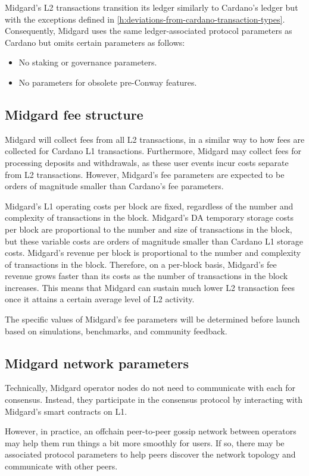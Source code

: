 \documentclass[../midgard.tex]{subfiles}
\begin{document}
Midgard's L2 transactions transition its ledger similarly to Cardano's ledger but with the exceptions defined in \cref{h:deviations-from-cardano-transaction-types}.
Consequently, Midgard uses the same ledger-associated protocol parameters as Cardano but omits certain parameters as follows:
\begin{itemize}
  \item No staking or governance parameters.
  \item No parameters for obsolete pre-Conway features.
\end{itemize}

\subsection{Midgard fee structure}
\label{h:midgard-fee-structure}

Midgard will collect fees from all L2 transactions, in a similar way to how fees are collected for Cardano L1 transactions.
Furthermore, Midgard may collect fees for processing deposits and withdrawals, as these user events incur costs separate from L2 transactions.
However, Midgard's fee parameters are expected to be orders of magnitude smaller than Cardano's fee parameters.

Midgard's L1 operating costs per block are fixed, regardless of the number and complexity of transactions in the block.
Midgard's DA temporary storage costs per block are proportional to the number and size of transactions in the block, but these variable costs are orders of magnitude smaller than Cardano L1 storage costs.
Midgard's revenue per block is proportional to the number and complexity of transactions in the block.
Therefore, on a per-block basis, Midgard's fee revenue grows faster than its costs as the number of transactions in the block increases.
This means that Midgard can sustain much lower L2 transaction fees once it attains a certain average level of L2 activity.

The specific values of Midgard's fee parameters will be determined before launch based on simulations, benchmarks, and community feedback.

\subsection{Midgard network parameters}
\label{h:midgard-network-parameters}

Technically, Midgard operator nodes do not need to communicate with each for consensus.
Instead, they participate in the consensus protocol by interacting with Midgard's smart contracts on L1.

However, in practice, an offchain peer-to-peer gossip network between operators may help them run things a bit more smoothly for users.
If so, there may be associated protocol parameters to help peers discover the network topology and communicate with other peers.
\end{document}
